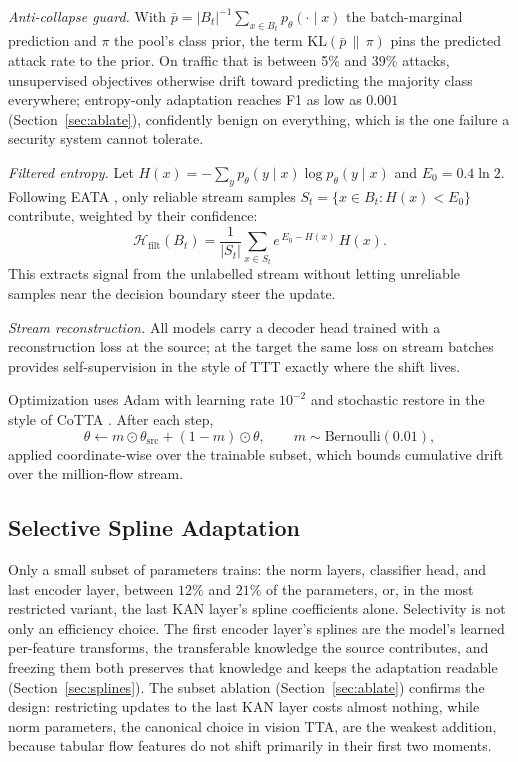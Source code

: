 \documentclass[10pt, conference, letterpaper]{IEEEtran}
\begin{document}
\emph{Anti-collapse guard.} With
$\bar{p}=|B_t|^{-1}\sum_{x\in B_t} p_\theta(\cdot \mid x)$ the
batch-marginal prediction and $\pi$ the pool's class prior, the term
$\mathrm{KL}(\bar{p}\,\|\,\pi)$ pins the predicted attack rate to the
prior. On traffic that is between 5\% and 39\% attacks, unsupervised
objectives otherwise drift toward predicting the majority class
everywhere; entropy-only adaptation reaches F1 as low as $0.001$
(Section~\ref{sec:ablate}), confidently benign on everything, which is
the one failure a security system cannot tolerate.

\emph{Filtered entropy.} Let
$H(x)=-\sum_y p_\theta(y \mid x)\log p_\theta(y \mid x)$ and
$E_0 = 0.4\ln 2$. Following EATA \cite{niu2022eata}, only reliable
stream samples $S_t=\{x \in B_t : H(x)<E_0\}$ contribute, weighted by
their confidence:
\begin{equation}
\mathcal{H}_{\text{filt}}(B_t) = \frac{1}{|S_t|} \sum_{x \in S_t}
e^{\,E_0 - H(x)}\, H(x).
\label{eq:ent}
\end{equation}
This extracts signal from the unlabelled stream without letting
unreliable samples near the decision boundary steer the update.

\emph{Stream reconstruction.} All models carry a decoder head trained
with a reconstruction loss at the source; at the target the same loss
on stream batches provides self-supervision in the style of TTT
\cite{sun2020ttt} exactly where the shift lives.

Optimization uses Adam with learning rate $10^{-2}$ and stochastic
restore in the style of CoTTA \cite{wang2022cotta}. After each step,
\begin{equation}
\theta \leftarrow m \odot \theta_{\text{src}} + (1-m)\odot\theta,
\qquad m \sim \mathrm{Bernoulli}(0.01),
\label{eq:restore}
\end{equation}
applied coordinate-wise over the trainable subset, which bounds
cumulative drift over the million-flow stream.

\subsection{Selective Spline Adaptation}\label{sec:selective}
Only a small subset of parameters trains: the norm layers, classifier
head, and last encoder layer, between $12\%$ and $21\%$ of the
parameters, or, in the most restricted variant, the last KAN layer's
spline coefficients alone. Selectivity is not only an efficiency
choice. The first encoder layer's splines are the model's learned
per-feature transforms, the transferable knowledge the source
contributes, and freezing them both preserves that knowledge and keeps
the adaptation readable (Section~\ref{sec:splines}). The subset ablation (Section~\ref{sec:ablate}) confirms the design:
restricting updates to the last KAN layer costs almost nothing, while norm parameters, the canonical choice in vision TTA, are the weakest addition, because tabular flow features do not shift primarily in their first two moments.
\end{document}
